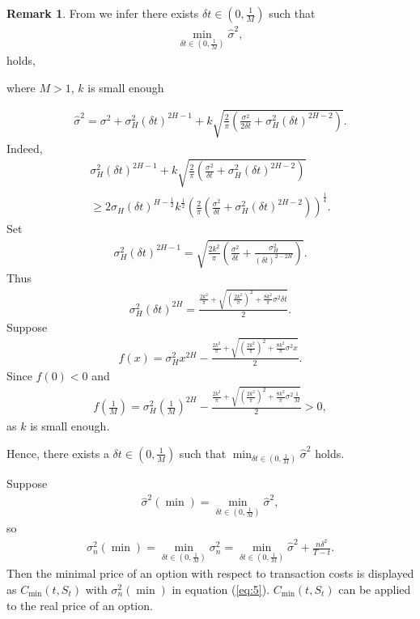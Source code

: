 \documentclass[a4paper,11pt]{amsart}
\numberwithin{equation}{section}
\theoremstyle{definition}
\theoremstyle{plain}
\theoremstyle{definition}
\newtheorem{rem}{Remark}[section]
\newcommand{\1}{\mathbf{1}}
\begin{document}
\begin{rem}  From \cite{wang1} we infer there exists $\delta t\in (0,\frac{1}{M})$ such that
\begin{eqnarray}
\min_{\delta t\in (0,\frac{1}{M})}\widehat{\sigma}^2,
\label{eq:12}
\end{eqnarray}
holds,

where $M>1$, $k$ is small enough

\begin{eqnarray}
\widehat{\sigma}^2=\sigma^2+\sigma_H^2(\delta t)^{2H-1}+k\sqrt{\frac{2}{\pi}\left(\frac{\sigma^2}{2\delta t}+\sigma_H^2(\delta t)^{2H-2}\right)}.
\label{eq:13}
\end{eqnarray}
Indeed,
\begin{eqnarray}
\sigma_H^2(\delta t)^{2H-1}+k\sqrt{\frac{2}{\pi}\left(\frac{\sigma^2}{\delta t}+\sigma_H^2(\delta t)^{2H-2}\right)}\nonumber\\
\geq 2\sigma_H(\delta t)^{H-\frac{1}{2}}k^{\frac{1}{2}}\left(\frac{2}{\pi}\left(\frac{\sigma^2}{\delta t}+\sigma_H^2(\delta t)^{2H-2}\right)\right)^{\frac{1}{4}}.
\label{eq:14}
\end{eqnarray}
Set
\begin{eqnarray}
\sigma_H^2(\delta t)^{2H-1}=\sqrt{\frac{2k^2}{\pi}\left(\frac{\sigma^2}{\delta t}+\frac{\sigma_H^2}{(\delta t)^{2-2H}}\right)}.
\label{eq:15}
\end{eqnarray}
Thus
\begin{eqnarray}
\sigma_H^2(\delta t)^{2H}=\frac{\frac{2k^2}{\pi}+\sqrt{\left(\frac{2k^2}{\pi}\right)^2+\frac{8k^2}{\pi}\sigma^2\delta t}}{2}.
\label{eq:16}
\end{eqnarray}
Suppose
\begin{eqnarray}
f(x)=\sigma_H^2x^{2H}-\frac{\frac{2k^2}{\pi}+\sqrt{\left(\frac{2k^2}{\pi}\right)^2+\frac{8k^2}{\pi}\sigma^2x}}{2}.
\label{eq:17}
\end{eqnarray}
Since $f(0)<0$ and
\begin{eqnarray}
f\left(\frac{1}{M}\right)=\sigma_H^2\left(\frac{1}{M}\right)^{2H}-\frac{\frac{2k^2}{\pi}+\sqrt{\left(\frac{2k^2}{\pi}\right)^2
+\frac{8k^2}{\pi}\sigma^2\frac{1}{M}}}{2}>0,
\label{eq:18}
\end{eqnarray}
as $k$ is small enough.

Hence, there exists a $\delta t\in (0,\frac{1}{M})$ such that $\min_{\delta t\in (0,\frac{1}{M})}\widehat{\sigma}^2$ holds.

Suppose
\begin{eqnarray}
\widehat{\sigma}^2(\min)=\min_{\delta t\in (0,\frac{1}{M})}\widehat{\sigma}^2,
\label{eq:19}
\end{eqnarray}
so
\begin{eqnarray}
\sigma_n^2(\min)=\min_{\delta t\in (0,\frac{1}{M})}\sigma_n^2=\min_{\delta t\in (0,\frac{1}{M})}\widehat{\sigma}^2+\frac{n\delta^2}{T-t}.
\label{eq:20}
\end{eqnarray}
Then the minimal price of an option with respect to transaction costs is displayed as $C_{\min}(t,S_t)$ with $\sigma_n^2(\min)$ in equation (\ref{eq:5}).
$C_{\min}(t,S_t)$ can be applied to the real price of an option.
\end{rem}
\end{document}
